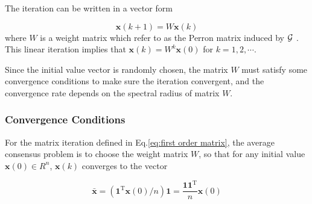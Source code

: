 The iteration  can be written in a vector
form 

\begin{equation}
\mathbf{x}(k+1)=W\mathbf{x}(k)\label{eq:first order matrix}
\end{equation}
where $W$ is a weight matrix which refer to as the Perron
matrix induced by ${\cal G}$ \cite{Olfati-Saber2004}. This linear
iteration implies that $\mathbf{x}(k)=W^{k}\mathbf{x}(0)$
for $k=1,2,\cdots$. 

Since the initial value vector is randomly chosen, the matrix $W$
must satisfy some convergence conditions to make sure the iteration
convergent, and the convergence rate depends on the spectral radius
of matrix $W$.


\subsubsection{Convergence Conditions}

For the matrix iteration defined in Eq.\eqref{eq:first order matrix},
the average consensus problem is to choose the weight matrix $W$,
so that for any initial value $\mathbf{x}(0)\in R^{n}$, $\mathbf{x}(k)$
converges to the vector 

\begin{equation}
\mathbf{\bar{x}}=\left(\mathbf{1}^{\mathrm{T}}\mathbf{x}(0)/n\right)\mathbf{1}=\dfrac{\mathbf{11}^{\mathrm{T}}}{n}\mathbf{x}(0)
\end{equation}

